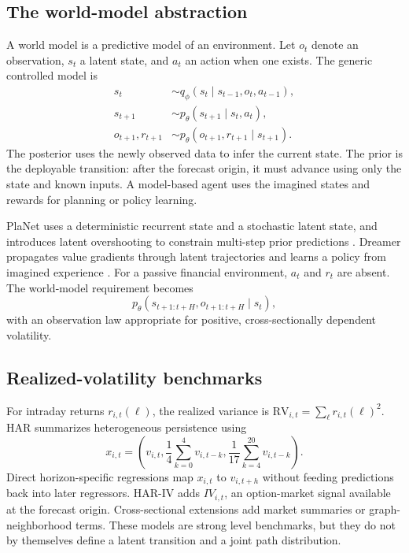 \documentclass[11pt]{article}
\newcommand{\RV}{\mathrm{RV}}\newcommand{\IV}{\mathrm{IV}}\newcommand{\cF}{\mathcal F}\newcommand{\R}{\mathbb R}
\begin{document}
\subsection{The world-model abstraction}
A world model is a predictive model of an environment. Let $o_t$ denote an observation, $s_t$ a latent state, and $a_t$ an action when one exists. The generic controlled model is
\begin{align}
 s_t&\sim q_\phi(s_t\mid s_{t-1},o_t,a_{t-1}),\\
 s_{t+1}&\sim p_\theta(s_{t+1}\mid s_t,a_t),\\
 o_{t+1},r_{t+1}&\sim p_\theta(o_{t+1},r_{t+1}\mid s_{t+1}).
\end{align}
The posterior uses the newly observed data to infer the current state. The prior is the deployable transition: after the forecast origin, it must advance using only the state and known inputs. A model-based agent uses the imagined states and rewards for planning or policy learning.

PlaNet uses a deterministic recurrent state and a stochastic latent state, and introduces latent overshooting to constrain multi-step prior predictions \cite{planet}. Dreamer propagates value gradients through latent trajectories and learns a policy from imagined experience \cite{dreamer}. For a passive financial environment, $a_t$ and $r_t$ are absent. The world-model requirement becomes
\begin{equation}
 p_\theta(s_{t+1:t+H},o_{t+1:t+H}\mid s_t),
\end{equation}
with an observation law appropriate for positive, cross-sectionally dependent volatility.

\subsection{Realized-volatility benchmarks}
For intraday returns $r_{i,t}(\ell)$, the realized variance is $\RV_{i,t}=\sum_\ell r_{i,t}(\ell)^2$. HAR summarizes heterogeneous persistence using
\begin{equation}
 x_{i,t}=\left(v_{i,t},\frac14\sum_{k=0}^{4}v_{i,t-k},\frac1{17}\sum_{k=4}^{20}v_{i,t-k}\right).
\end{equation}
Direct horizon-specific regressions map $x_{i,t}$ to $v_{i,t+h}$ without feeding predictions back into later regressors. HAR-IV adds $IV_{i,t}$, an option-market signal available at the forecast origin. Cross-sectional extensions add market summaries or graph-neighborhood terms. These models are strong level benchmarks, but they do not by themselves define a latent transition and a joint path distribution.
\end{document}
